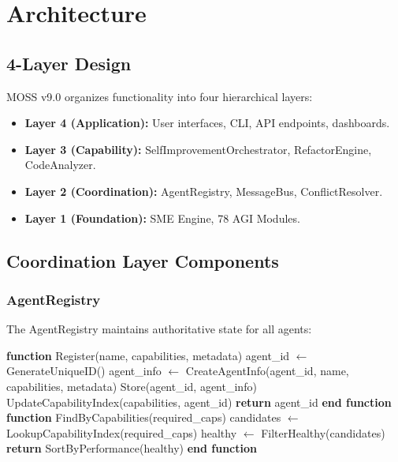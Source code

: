 \documentclass[11pt,a4paper]{article}
\begin{document}
\section{Architecture}

\subsection{4-Layer Design}

MOSS v9.0 organizes functionality into four hierarchical layers:

\begin{itemize}
    \item \textbf{Layer 4 (Application):} User interfaces, CLI, API endpoints, dashboards.
    \item \textbf{Layer 3 (Capability):} SelfImprovementOrchestrator, RefactorEngine, CodeAnalyzer.
    \item \textbf{Layer 2 (Coordination):} AgentRegistry, MessageBus, ConflictResolver.
    \item \textbf{Layer 1 (Foundation):} SME Engine, 78 AGI Modules.
\end{itemize}

\subsection{Coordination Layer Components}

\subsubsection{AgentRegistry}

The AgentRegistry maintains authoritative state for all agents:

\begin{algorithm}
\caption{Agent Registration and Discovery}
\begin{algorithmic}[1]
\State \textbf{function} Register(name, capabilities, metadata)
\State \quad agent\_id $\leftarrow$ GenerateUniqueID()
\State \quad agent\_info $\leftarrow$ CreateAgentInfo(agent\_id, name, capabilities, metadata)
\State \quad Store(agent\_id, agent\_info)
\State \quad UpdateCapabilityIndex(capabilities, agent\_id)
\State \quad \textbf{return} agent\_id
\State \textbf{end function}
\State
\State \textbf{function} FindByCapabilities(required\_caps)
\State \quad candidates $\leftarrow$ LookupCapabilityIndex(required\_caps)
\State \quad healthy $\leftarrow$ FilterHealthy(candidates)
\State \quad \textbf{return} SortByPerformance(healthy)
\State \textbf{end function}
\end{algorithmic}
\end{algorithm}
\end{document}
